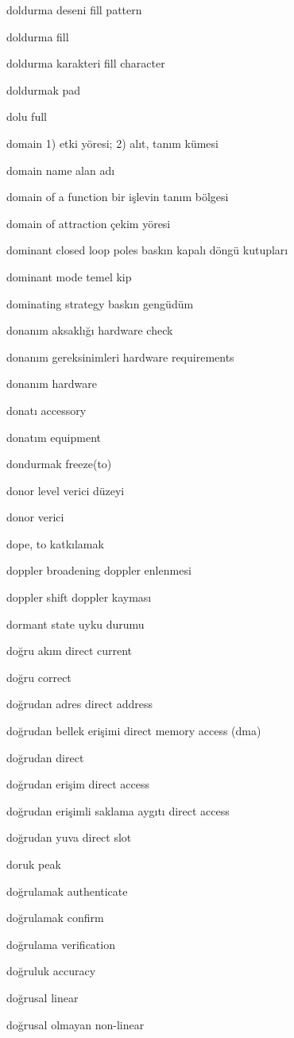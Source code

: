 \documentclass[12pt,fleqn]{article}\usepackage{../../common}
\begin{document}
doldurma deseni fill pattern

doldurma fill

doldurma karakteri fill character

doldurmak pad

dolu full

domain 1) etki yöresi; 2) alıt, tanım kümesi

domain name alan adı

domain of a function bir işlevin tanım bölgesi

domain of attraction çekim yöresi

dominant closed loop poles baskın kapalı döngü kutupları

dominant mode temel kip

dominating strategy baskın gengüdüm

donanım aksaklığı hardware check

donanım gereksinimleri hardware requirements

donanım hardware

donatı accessory

donatım equipment

dondurmak freeze(to)

donor level verici düzeyi

donor verici

dope, to katkılamak

doppler broadening doppler enlenmesi

doppler shift doppler kayması

dormant state uyku durumu

doğru akım direct current

doğru correct

doğrudan adres direct address

doğrudan bellek erişimi direct memory access (dma)

doğrudan direct

doğrudan erişim direct access

doğrudan erişimli saklama aygıtı direct access

doğrudan yuva direct slot

doruk peak

doğrulamak authenticate

doğrulamak confirm

doğrulama verification

doğruluk accuracy

doğrusal linear

doğrusal olmayan non-linear
\end{document}

